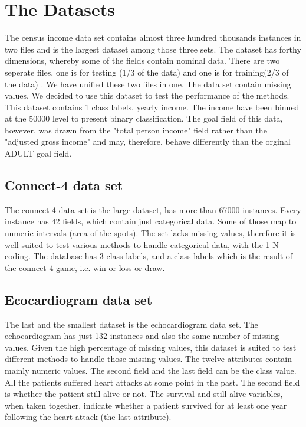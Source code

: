 \documentclass[a4paper]{article}
\begin{document}
\section{The Datasets}
The census income data set contains almost three hundred thousands instances in two files and is the largest dataset among those three sets. The dataset has forthy dimensions, whereby some of the fields contain nominal data. There are two seperate files, one is for testing (1/3 of the data) and one is for training(2/3 of the data) . We have unified these two files in one. The data set contain missing values. We decided to use this dataset to test the performance of the methods. This dataset contains 1 class labels, yearly income. The income have been binned at the 50000 level to present binary classification. The goal field of this data, however, was drawn from the "total person income" field rather than the "adjusted gross income" and may, therefore, behave differently than the orginal ADULT goal field.

\subsection{Connect-4 data set}
The connect-4 data set is the large dataset, has more than 67000 instances.
Every instance has 42 fields, which contain just categorical data. Some of those
map to numeric intervals
(area of the spots). The set lacks missing values, therefore it is well suited
to test various methods to handle categorical data, with the 1-N coding. The
database has 3 class labels, and a class labels which
is the result of the connect-4 game, i.e. win or loss or draw.

\subsection{Ecocardiogram data set}
The last and the smallest dataset is the echocardiogram data set. The
echocardiogram has just 132 instances and also the same number of missing
values. Given the high percentage of
missing values, this dataset is suited to test different methods to handle those
missing values. The twelve attributes contain mainly numeric values. The second
field and the last field can be the class value. All the patients suffered heart
attacks at some point in the past. The second field is whether the patient still
alive or not. The survival and still-alive variables, when taken together,
indicate whether a patient survived for at least one year following the heart
attack (the last attribute). 
\end{document}
